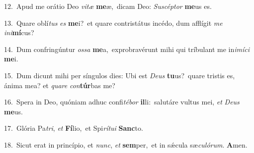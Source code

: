 {\numbfont\textcolor{\numbcolor}{12.}}~Apud me orátio Deo \textit{vi}\-\textit{tæ} \textbf{me}\-æ,~\star dicam Deo: \textit{Su}\-\textit{scép}\textit{tor} \textbf{me}\-us es.\par
{\numbfont\textcolor{\numbcolor}{13.}}~Quare oblí\textit{tus} \textit{es} \textbf{me}\-i?~\star et quare contristátus incédo, dum afflígit \textit{me} \textit{in}\-\textit{i}\textbf{mí}cus?\par
{\numbfont\textcolor{\numbcolor}{14.}}~Dum confringúntur \textit{os}\-\textit{sa} \textbf{me}\-a,~\star exprobravérunt mihi qui tríbulant me in\-\textit{i}\-\textit{mí}\textit{ci} \textbf{me}\-i.\par
{\numbfont\textcolor{\numbcolor}{15.}}~Dum dicunt mihi per síngulos dies: Ubi est \textit{De}\-\textit{us} \textbf{tu}\-us?~\star quare tristis es, ánima mea? et \textit{qua}\-\textit{re} \textit{con}\-\textbf{túr}bas me?\par
{\numbfont\textcolor{\numbcolor}{16.}}~Spera in Deo, quóniam adhuc confi\-\textit{té}\-\textit{bor} \textbf{il}\-li:~\star salutáre vultus mei, \textit{et} \textit{De}\-\textit{us} \textbf{me}\-us.\par
{\numbfont\textcolor{\numbcolor}{17.}}~Glória Pa\-\textit{tri}\-, \textit{et} \textbf{Fí}\-lio,~\star et Spi\-\textit{rí}\-\textit{tu}\textit{i} \textbf{Sanc}\-to.\par
{\numbfont\textcolor{\numbcolor}{18.}}~Sicut erat in princípio, et \textit{nunc}\-, \textit{et} \textbf{sem}\-per,~\star et in sǽcula sæ\-\textit{cu}\-\textit{ló}\textit{rum}. \textbf{A}\-men.\par
